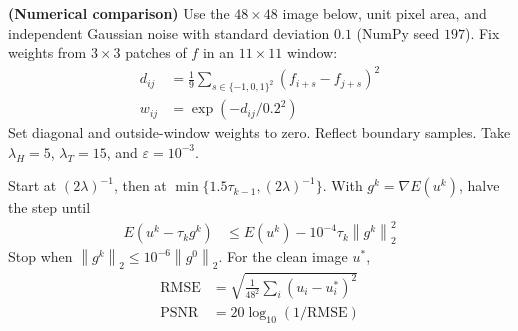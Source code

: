 \documentclass[12pt,letterpaper]{article}
\newcommand{\eps}{\varepsilon}
\newcommand{\norm}[1]{\left\lVert #1\right\rVert}
\newcommand{\partlabel}[1]{\par\medskip\noindent\textbf{(#1)}\enspace}
\begin{document}
\clearpage
\partlabel{Numerical comparison}
Use the $48\times48$ image below, unit pixel area, and independent
Gaussian noise with standard deviation $0.1$ (NumPy seed $197$).
Fix weights from $3\times3$ patches of $f$ in an $11\times11$ window:
\begin{align*}
 d_{ij}&=\frac19\sum_{s\in\{-1,0,1\}^2}(f_{i+s}-f_{j+s})^2\\
 w_{ij}&=\exp(-d_{ij}/0.2^2)
\end{align*}
Set diagonal and outside-window weights to zero. Reflect boundary samples.
Take $\lambda_H=5$, $\lambda_T=15$, and $\eps=10^{-3}$.

Start at $(2\lambda)^{-1}$, then at
$\min\{1.5\tau_{k-1},(2\lambda)^{-1}\}$. With $g^k=\nabla E(u^k)$, halve the step until
\begin{align*}
 E(u^k-\tau_k g^k)&\leq E(u^k)-10^{-4}\tau_k\norm{g^k}_2^2
\end{align*}
Stop when $\norm{g^k}_2\leq10^{-6}\norm{g^0}_2$.
For the clean image $u^*$,
\begin{align*}
 \mathrm{RMSE}&=\sqrt{\frac1{48^2}\sum_i(u_i-u_i^*)^2}\\
 \mathrm{PSNR}&=20\log_{10}(1/\mathrm{RMSE})
\end{align*}
\end{document}

